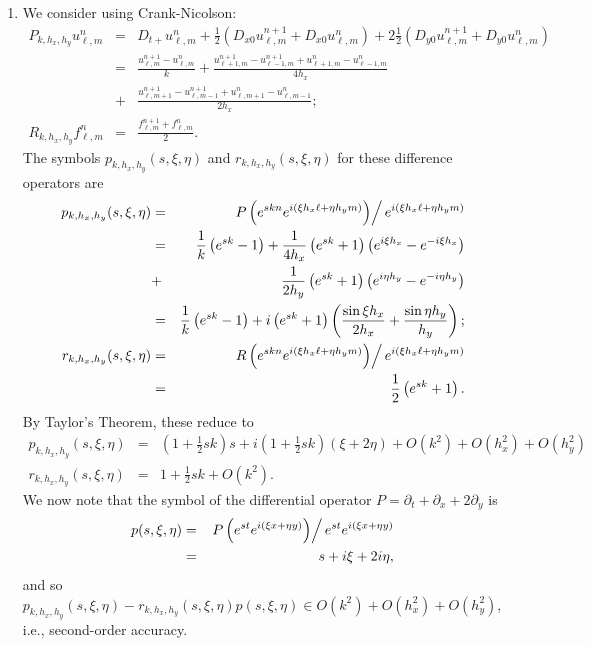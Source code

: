 \documentclass{article}
\begin{document}
\begin{enumerate}
\begin{enumerate}
\item We consider using Crank-Nicolson:
\begin{eqnarray*}
P_{k,h_x,h_y} u^n_{\ell,m}
& = & D_{t+} u^n_{\ell,m} + \frac{1}{2} \left( D_{x0} u^{n+1}_{\ell,m} + D_{x0} u^n_{\ell,m} \right)
                          + 2 \frac{1}{2} \left( D_{y0} u^{n+1}_{\ell,m} + D_{y0} u^n_{\ell,m} \right) \\
& = & \frac{u^{n+1}_{\ell,m} - u^n_{\ell,m}}{k}
    + \frac{u^{n+1}_{\ell+1,m} - u^{n+1}_{\ell-1,m} + u^n_{\ell+1,m} - u^n_{\ell-1,m}}{4h_x} \\
& + & \frac{u^{n+1}_{\ell,m+1} - u^{n+1}_{\ell,m-1} + u^n_{\ell,m+1} - u^n_{\ell,m-1}}{2h_x}; \\
R_{k,h_x,h_y} f^n_{\ell,m} & = & \frac{f^{n+1}_{\ell,m} + f^n_{\ell,m}}{2}.
\end{eqnarray*}
The symbols \(p_{k,h_x,h_y}(s,\xi,\eta)\) and \(r_{k,h_x,h_y}(s,\xi,\eta)\) for these difference operators are
\begin{eqnarray*}
p_{k,h_x,h_y}(s,\xi,\eta)
& = & \left. P \left( e^{skn} e^{i(\xi h_x\ell + \eta h_ym)} \right) \right/ e^{i(\xi h_x\ell + \eta h_ym)} \\
& = & \frac{1}{k} \left( e^{sk} - 1 \right)
    + \frac{1}{4h_x} \left( e^{sk} + 1 \right) \left( e^{i\xi h_x} - e^{-i\xi h_x} \right) \\
& + & \frac{1}{2h_y} \left( e^{sk} + 1 \right) \left( e^{i\eta h_y} - e^{-i\eta h_y} \right) \\
& = & \frac{1}{k} \left( e^{sk} - 1 \right)
    + i \left( e^{sk} + 1 \right) \left( \frac{\sin \xi h_x}{2h_x} + \frac{\sin \eta h_y}{h_y} \right); \\
r_{k,h_x,h_y}(s,\xi,\eta)
& = & \left. R \left( e^{skn} e^{i(\xi h_x\ell + \eta h_ym)} \right) \right/ e^{i(\xi h_x\ell + \eta h_ym)} \\
& = & \frac{1}{2} \left( e^{sk} + 1 \right).
\end{eqnarray*}
By Taylor's Theorem, these reduce to
\begin{eqnarray*}
p_{k,h_x,h_y}(s,\xi,\eta)
& = & \left( 1 + \frac{1}{2} sk \right) s + i \left( 1 + \frac{1}{2} sk \right) \left( \xi + 2 \eta \right) + O(k^2) + O(h_x^2) + O(h_y^2) \\
r_{k,h_x,h_y}(s,\xi,\eta)
& = & 1 + \frac{1}{2} sk + O(k^2).
\end{eqnarray*}
We now note that the symbol of the differential operator \(P = \partial_t + \partial_x + 2\partial_y\) is
\begin{eqnarray*}
p(s,\xi,\eta)
& = & \left. P \left( e^{st} e^{i(\xi x + \eta y)} \right) \right/ e^{st} e^{i(\xi x + \eta y)} \\
& = & s + i\xi + 2i\eta,
\end{eqnarray*}
and so \(p_{k,h_x,h_y}(s,\xi,\eta) - r_{k,h_x,h_y}(s,\xi,\eta) p(s,\xi,\eta) \in O(k^2) + O(h_x^2) + O(h_y^2)\), i.e., second-order accuracy.


\end{enumerate}
\end{enumerate}
\end{document}
